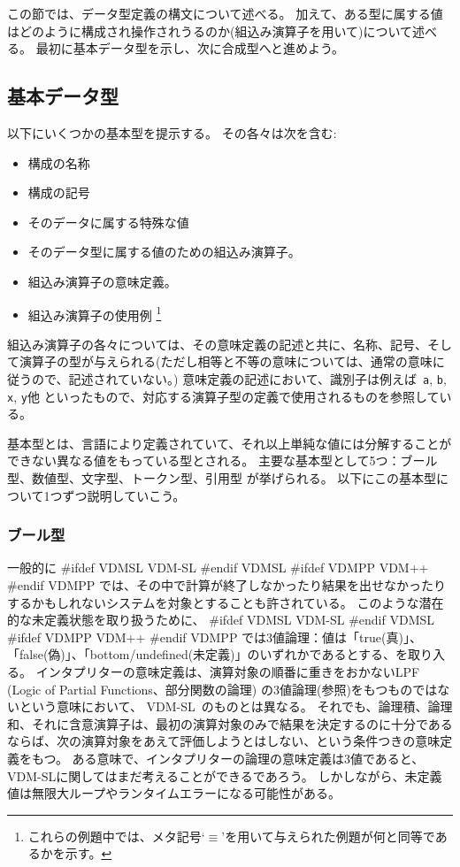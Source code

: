 \documentclass[\pformat,12pt]{jarticle}
\newcommand{\vdmslpp}[2]{%
#ifdef VDMSL
#1
#endif VDMSL
#ifdef VDMPP
#2
#endif VDMPP
}
\newcommand{\vdmsl}{VDM-SL}
\newcommand{\vdmpp}{VDM++}
\begin{document}
この節では、データ型定義の構文について述べる。
加えて、ある型に属する値はどのように構成され操作されうるのか(組込み演算子を用いて)について述べる。
最初に基本データ型を示し、次に合成型へと進めよう。

\subsection{基本データ型}

以下にいくつかの基本型を提示する。
その各々は次を含む:

\begin{itemize}
\item 構成の名称
\item 構成の記号
\item そのデータに属する特殊な値
\item そのデータ型に属する値のための組込み演算子。
\item 組込み演算子の意味定義。
\item 組込み演算子の使用例
  \footnote{これらの例題中では、メタ記号`$\equiv$'を用いて与えられた例題が何と同等であるかを示す。}
\end{itemize}
組込み演算子の各々については、その意味定義の記述と共に、名称、記号、そして演算子の型が与えられる(ただし相等と不等の意味については、通常の意味に従うので、記述されていない。)
意味定義の記述において、識別子は例えば\ {\tt a}, {\tt b}, {\tt x}, {\tt y}他 といったもので、対応する演算子型の定義で使用されるものを参照している。

基本型とは、言語により定義されていて、それ以上単純な値には分解することができない異なる値をもっている型とされる。
主要な基本型として5つ：ブール型、数値型、文字型、トークン型、引用型 が挙げられる。
以下にこの基本型について1つずつ説明していこう。

\subsubsection{ブール型}\label{bool}

一般的に \vdmslpp{\vdmsl}{\vdmpp} では、その中で計算が終了しなかったり結果を出せなかったりするかもしれないシステムを対象とすることも許されている。
このような潜在的な未定義状態を取り扱うために、\vdmslpp{\vdmsl}{\vdmpp} では3値論理：値は「true(真)」、「false(偽)」、「bottom/undefined(未定義)」のいずれかであるとする、を取り入る。
インタプリターの意味定義は、演算対象の順番に重きをおかないLPF (Logic of Partial Functions、部分関数の論理) の3値論理(\cite{Jones90a}参照)をもつものではないという意味において、 \vdmsl\ のものとは異なる。
それでも、論理積、論理和、それに含意演算子は、最初の演算対象のみで結果を決定するのに十分であるならば、次の演算対象をあえて評価しようとはしない、という条件つきの意味定義をもつ。
ある意味で、インタプリターの論理の意味定義は3値であると、VDM-SLに関してはまだ考えることができるであろう。
しかしながら、未定義値は無限大ループやランタイムエラーになる可能性がある。
\end{document}

